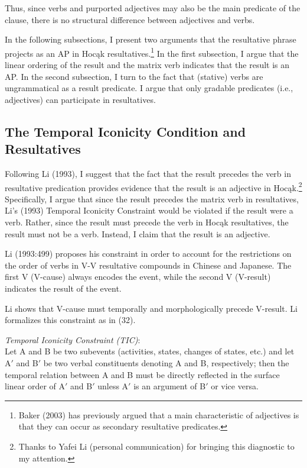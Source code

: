 \documentclass[output=paper]{LSP/langsci}
\begin{document}
Thus, since verbs and purported adjectives may also be the main predicate of the clause, there is no structural difference between adjectives and verbs.

In the following subsections, I present two arguments that the resultative phrase projects as an AP in Hoc\k{a}k resultatives.\footnote{Baker (2003) has previously argued that a main characteristic of adjectives is that they can occur as secondary resultative predicates.} In the first subsection, I argue that the linear ordering of the result and the matrix verb indicates that the result is an AP. In the second subsection, I turn to the fact that (stative) verbs are ungrammatical as a result predicate. I argue that only gradable predicates (i.e., adjectives) can participate in resultatives. 

\subsection{The Temporal Iconicity Condition and Resultatives}

Following Li (1993), I suggest that the fact that the result precedes the verb in resultative predication provides evidence that the result is an adjective in Hoc\k{a}k.\footnote{Thanks to Yafei Li (personal communication) for bringing this diagnostic to my attention.} Specifically, I argue that since the result precedes the matrix verb in resultatives, Li's (1993) Temporal Iconicity Constraint would be violated if the result were a verb. Rather, since the result must precede the verb in Hoc\k{a}k resultatives, the result must not be a verb. Instead, I claim that the result is an adjective.

Li (1993:499) proposes his constraint in order to account for the restrictions on the order of verbs in V-V resultative compounds in Chinese and Japanese. The first V (V-cause) always encodes the event, while the second V (V-result) indicates the result of the event. 

Li shows that V-cause must temporally and morphologically precede V-result. Li formalizes this constraint as in (32).

\begin{exe}

\ex
 \emph{Temporal Iconicity Constraint (TIC)}:\\
 Let A and B be two subevents (activities, states, changes of states, etc.) and let A$'$ and B$'$ be two verbal constituents denoting A and B, respectively; then the temporal relation between A and B must be directly reflected in the surface linear order of A$'$ and B$'$ unless A$'$ is an argument of B$'$ or vice versa.
 
 \end{exe}
\end{document}
